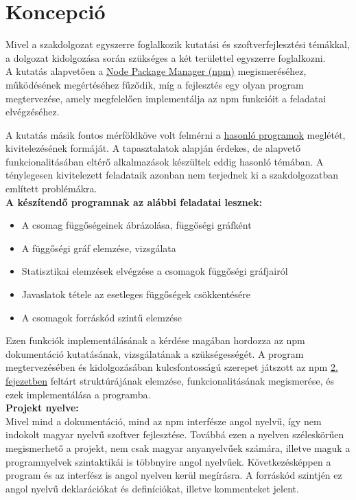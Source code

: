 
\section{Koncepció}

Mivel a szakdolgozat egyszerre foglalkozik kutatási és szoftverfejlesztési témákkal, a dolgozat kidolgozása során szükséges a két területtel egyszerre foglalkozni.\\ 

A kutatás alapvetően a \hyperlink{chapter.2}{Node Package Manager (npm)} megismeréséhez, működésének megértéséhez fűződik, míg a fejlesztés egy olyan program megtervezése, amely megfelelően implementálja az npm funkcióit a feladatai elvégzéséhez.

A kutatás másik fontos mérföldköve volt felmérni a \hyperlink{section.3.2}{hasonló programok} meglétét, kivitelezésének formáját. A tapasztalatok alapján érdekes, de alapvető funkcionalitásában eltérő alkalmazások készültek eddig hasonló témában. A ténylegesen kivitelezett feladataik azonban nem terjednek ki a szakdolgozatban említett problémákra.\\

\textbf{A készítendő programnak az alábbi feladatai lesznek:}
\begin{itemize}
	\item A csomag függőségeinek ábrázolása, függőségi gráfként
	\item A függőségi gráf elemzése, vizsgálata
	\item Statisztikai elemzések elvégzése a csomagok függőségi gráfjairól
	\item Javaslatok tétele az esetleges függőségek csökkentésére
	\item A csomagok forráskód szintű elemzése
\end{itemize}

Ezen funkciók implementálásának a kérdése magában hordozza az npm dokumentáció kutatásának, vizsgálatának a szükségességét.
A program megtervezésében és kidolgozásában kulcsfontosságú szerepet játszott az npm \hyperlink{chapter.2}{2. fejezetben} feltárt struktúrájának elemzése, funkcionalitásának megismerése, és ezek implementálása a programba.\\

\textbf{Projekt nyelve:}\\

Mivel mind a dokumentáció, mind az npm interfésze angol nyelvű, így nem indokolt magyar nyelvű szoftver fejlesztése. Továbbá ezen a nyelven széleskörűen megismerhető a projekt, nem csak magyar anyanyelvűek számára, illetve maguk a programnyelvek szintaktikái is többnyire angol nyelvűek. Következésképpen a program és az interfész is angol nyelven kerül megírásra. A forráskód szintjén ez angol nyelvű deklarációkat és definíciókat, illetve kommenteket jelent. 

